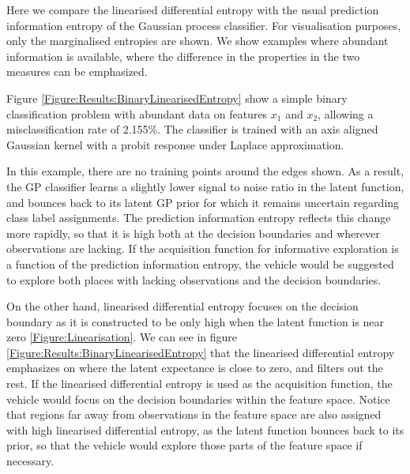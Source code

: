 \documentclass{article}
\begin{document}
		Here we compare the linearised differential entropy with the usual prediction information entropy of the Gaussian process classifier. For visualisation purposes, only the marginalised entropies are shown. We show examples where abundant information is available, where the difference in the properties in the two measures can be emphasized. 
		
		Figure \ref{Figure:Results:BinaryLinearisedEntropy} show a simple binary classification problem with abundant data on features $x_{1}$ and $x_{2}$, allowing a misclassification rate of 2.155\%. The classifier is trained with an axis aligned Gaussian kernel with a probit response under Laplace approximation. 

		In this example, there are no training points around the edges shown. As a result, the GP classifier learns a slightly lower signal to noise ratio in the latent function, and bounces back to its latent GP prior for which it remains uncertain regarding class label assignments. The prediction information entropy reflects this change more rapidly, so that it is high both at the decision boundaries and wherever observations are lacking. If the acquisition function for informative exploration is a function of the prediction information entropy, the vehicle would be suggested to explore both places with lacking observations and the decision boundaries. 
		
		On the other hand, linearised differential entropy focuses on the decision boundary as it is constructed to be only high when the latent function is near zero \ref{Figure:Linearisation}. We can see in figure \ref{Figure:Results:BinaryLinearisedEntropy} that the linearised differential entropy emphasizes on where the latent expectance is close to zero, and filters out the rest. If the linearised differential entropy is used as the acquisition function, the vehicle would focus on the decision boundaries within the feature space. Notice that regions far away from observations in the feature space are also assigned with high linearised differential entropy, as the latent function bounces back to its prior, so that the vehicle would explore those parts of the feature space if necessary.
		
		
\end{document}
